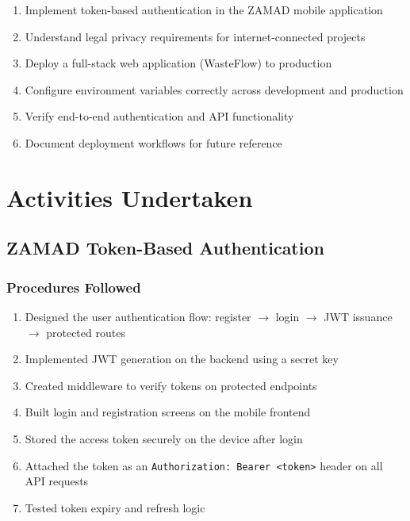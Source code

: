 \documentclass[12pt,a4paper]{article}
\begin{document}
\begin{enumerate}
    \item Implement token-based authentication in the ZAMAD mobile application
    \item Understand legal privacy requirements for internet-connected projects
    \item Deploy a full-stack web application (WasteFlow) to production
    \item Configure environment variables correctly across development and production
    \item Verify end-to-end authentication and API functionality
    \item Document deployment workflows for future reference
\end{enumerate}

\newpage
\section{Activities Undertaken}
\label{sec:activities}

\subsection{ZAMAD Token-Based Authentication}
\label{subsec:zamad}

\subsubsection*{Procedures Followed}
\begin{enumerate}
    \item Designed the user authentication flow: register $\rightarrow$ login $\rightarrow$ JWT issuance $\rightarrow$ protected routes
    \item Implemented JWT generation on the backend using a secret key
    \item Created middleware to verify tokens on protected endpoints
    \item Built login and registration screens on the mobile frontend
    \item Stored the access token securely on the device after login
    \item Attached the token as an \texttt{Authorization: Bearer <token>} header on all API requests
    \item Tested token expiry and refresh logic
\end{enumerate}
\end{document}
